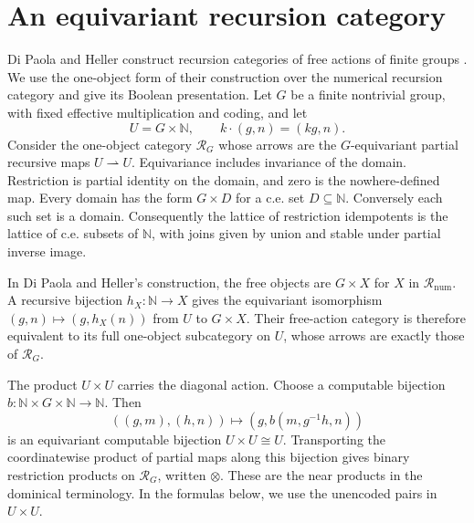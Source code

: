 \documentclass[11pt]{article}
\theoremstyle{definition}
\theoremstyle{remark}
\begin{document}
\section{An equivariant recursion category}
\label{sec:equivariant-model}

Di Paola and Heller construct recursion categories of free actions
of finite groups \cite[Section~7.9(3), Theorem~7.9.9]{DPH}.
We use the one-object form of their construction over the numerical
recursion category and give its Boolean presentation.
Let $G$ be a finite nontrivial group, with fixed
effective multiplication and coding, and let
\[
 U=G\times\mathbb N,
 \qquad k\cdot(g,n)=(kg,n).
\]
Consider the one-object category $\mathcal R_G$ whose arrows are
the $G$-equivariant partial recursive maps $U\rightharpoonup U$.
Equivariance includes invariance of the domain.  Restriction is
partial identity on the domain, and zero is the nowhere-defined
map.  Every domain has the form $G\times D$ for a c.e. set
$D\subseteq\mathbb N$.  Conversely each such set is a domain.
Consequently the lattice of restriction idempotents is the lattice of c.e. subsets
of $\mathbb N$, with joins given by union and stable under
partial inverse image.

In Di Paola and Heller's construction, the free objects are
$G\times X$ for $X$ in $\mathcal R_{\mathrm{num}}$.
A recursive bijection $h_X:\mathbb N\to X$ gives the equivariant
isomorphism $(g,n)\mapsto(g,h_X(n))$ from $U$ to $G\times X$.
Their free-action category is therefore equivalent to its full
one-object subcategory on $U$, whose arrows are exactly those of
$\mathcal R_G$.

The product $U\times U$ carries the diagonal action.  Choose a
computable bijection
$b:\mathbb N\times G\times\mathbb N\to\mathbb N$.
Then
\[
 ((g,m),(h,n))\longmapsto(g,b(m,g^{-1}h,n))
\]
is an equivariant computable bijection $U\times U\cong U$.
Transporting the coordinatewise product of partial maps along this
bijection gives binary restriction products on $\mathcal R_G$,
written $\otimes$. These are the near products in the dominical
terminology. In the formulas below, we use the unencoded pairs
in $U\times U$.
\end{document}
